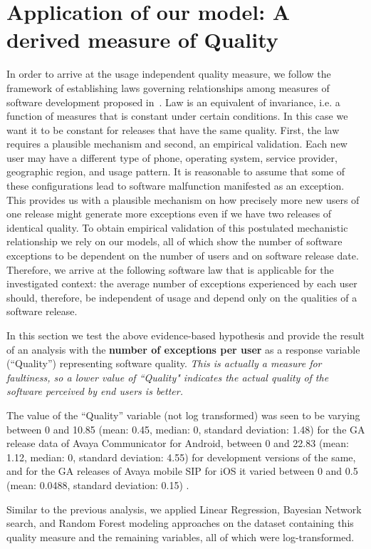 \documentclass[smallextended]{svjour3}       %
\begin{document}
\section{Application of our model: A derived measure of Quality}\label{s:qual}
In order to arrive at the usage independent quality measure, we follow the framework of establishing laws governing relationships among measures of software development proposed in~\cite{mockuskeynote}. Law is an equivalent of invariance, i.e. a function of measures that is constant under certain conditions. In this case we want it to be constant for releases that have the same quality. First, the law requires a plausible mechanism and second, an empirical validation. Each new user may have a different type of phone, operating system, service provider, geographic region, and usage pattern. It is reasonable to assume that some of these configurations lead to software malfunction manifested as an exception. This provides us with a plausible mechanism on how precisely more new users of one release might generate more exceptions even if we have two releases of identical quality. To obtain empirical validation of this postulated mechanistic relationship we rely on our models, all of which show the number of software 
exceptions to be dependent on the number of users and on software release date. Therefore,
we arrive at the following software law that is applicable for the investigated context: the average number of 
exceptions experienced by each user should, therefore, be independent of usage and depend only on the qualities of a software release.

In this section we test the above evidence-based hypothesis and provide the result of an analysis with the \textbf{number of exceptions per user} as a response variable (``Quality'') representing software quality. 
\emph{This is actually a measure for faultiness, so a lower value of ``Quality" indicates the actual quality of the software perceived by end users is better.}

The value of the ``Quality'' variable (not log transformed) was seen to be varying between 0 and 10.85 (mean: 0.45, median: 0, standard deviation: 1.48) for the GA release data of Avaya Communicator for Android, between 0 and 22.83 (mean: 1.12, median: 0, standard deviation: 4.55) for development versions of the same, and for the GA releases of Avaya mobile SIP for iOS it varied between 0 and 0.5 (mean: 0.0488, standard deviation: 0.15) . %

Similar to the previous analysis, we applied Linear Regression, Bayesian Network search, and 
Random Forest modeling approaches on the dataset containing this quality measure and the remaining variables, all of which were log-transformed. 
\end{document}
